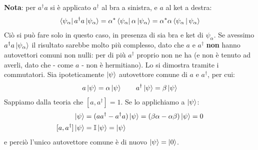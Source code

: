 \documentclass[../../FisicaTeorica.tex]{subfiles}
\begin{document}
\begin{enumerate}
\textbf{Nota}: per $a^\dag a$ si è applicato $a^\dag$ al bra a sinistra, e $a$ al ket a destra:
\begin{align*}
\Bra{\psi_\alpha} a^\dag a \Ket{\psi_\alpha} =\alpha^* \Bra{\psi_\alpha} \alpha \Ket{\psi_\alpha} = \alpha^*\alpha \Braket{\psi_\alpha|\psi_\alpha}
\end{align*}
Ciò si può fare solo in questo caso, in presenza di sia bra e ket di $\psi_\alpha$. Se avessimo $a^\dag a \Ket{\psi_\alpha}$ il risultato sarebbe molto più complesso, dato che $a$ e $a^\dag$ \textbf{non} hanno autovettori comuni non nulli: per di più $a^\dag$ proprio non ne ha (e non è tenuto ad averli, dato che - come $a$ - non è hermitiano). Lo si dimostra tramite i commutatori. Sia ipoteticamente $\Ket{\psi}$ autovettore comune di $a$ e $a^\dag$, per cui:
\begin{align*}
a \Ket{\psi} = \alpha \Ket{\psi} \qquad a^\dag \Ket{\psi} = \beta \Ket{\psi}
\end{align*} 
Sappiamo dalla teoria che $[a,a^\dag]=1$. Se lo applichiamo a $\Ket{\psi}$:
\begin{align*}
[a,a^\dag]\ket{\psi} &= (aa^\dag - a^\dag a)\ket{\psi} = (\beta \alpha - \alpha \beta)\ket{\psi} = 0\\
[a,a^\dag]\ket{\psi} &= \bb{I} \ket{\psi} =\ket{\psi}
\end{align*}
e perciò l'unico autovettore comune è di nuovo $\Ket{\psi}=\Ket{0}$.


\end{enumerate}
\end{document}
